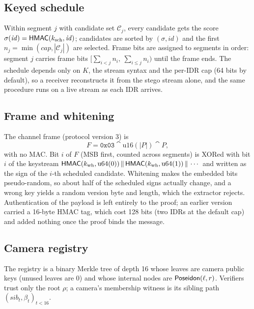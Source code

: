 \subsection{Keyed schedule}
Within segment $j$ with candidate set $\mathcal C_j$, every candidate gets the score $\sigma(\mathit{id})=\mathsf{HMAC}(k_{\mathrm{sch}},\mathit{id})$; candidates are sorted by $(\sigma,\mathit{id})$ and the first $n_j=\min(\mathit{cap},|\mathcal C_j|)$ are selected. Frame bits are assigned to segments in order: segment $j$ carries frame bits $[\sum_{i<j}n_i,\ \sum_{i\le j}n_i)$ until the frame ends. The schedule depends only on $K$, the stream syntax and the per-IDR cap (64 bits by default), so a receiver reconstructs it from the stego stream alone, and the same procedure runs on a live stream as each IDR arrives.

\subsection{Frame and whitening}
The channel frame (protocol version 3) is
\begin{equation}
F=\texttt{0x03}\cat \mathrm{u16}(|P|)\cat P,
\end{equation}
with no MAC. Bit $i$ of $F$ (MSB first, counted across segments) is XORed with bit $i$ of the keystream $\mathsf{HMAC}(k_{\mathrm{wh}},\mathrm{u64}(0))\,\|\,\mathsf{HMAC}(k_{\mathrm{wh}},\mathrm{u64}(1))\,\|\,\cdots$ and written as the sign of the $i$-th scheduled candidate. Whitening makes the embedded bits pseudo-random, so about half of the scheduled signs actually change, and a wrong key yields a random version byte and length, which the extractor rejects. Authentication of the payload is left entirely to the proof; an earlier version carried a 16-byte HMAC tag, which cost 128 bits (two IDRs at the default cap) and added nothing once the proof binds the message.

\subsection{Camera registry}
The registry is a binary Merkle tree of depth 16 whose leaves are camera public keys (unused leaves are 0) and whose internal nodes are $\mathsf{Poseidon}(\ell,r)$. Verifiers trust only the root $\rho$; a camera's membership witness is its sibling path $(\mathit{sib}_t,\beta_t)_{t<16}$.

